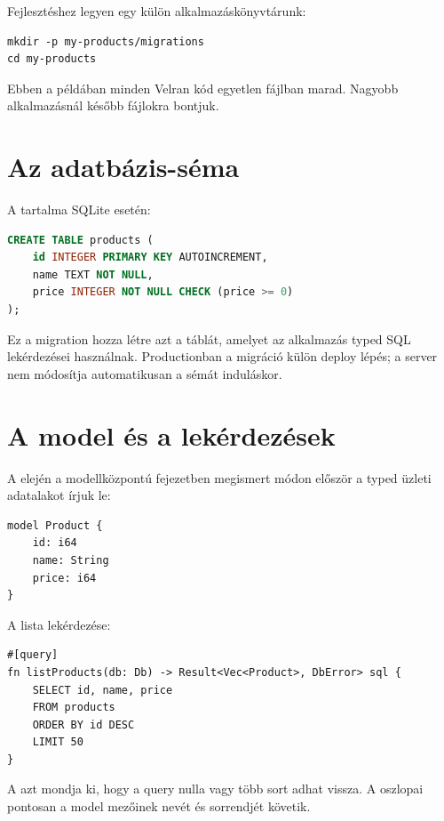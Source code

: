 Fejlesztéshez legyen egy külön alkalmazáskönyvtárunk:

\begin{lstlisting}
mkdir -p my-products/migrations
cd my-products
\end{lstlisting}

Ebben a példában minden Velran kód egyetlen  fájlban marad. Nagyobb alkalmazásnál később  fájlokra bontjuk.

\section{Az adatbázis-séma}

A  tartalma SQLite esetén:

\begin{lstlisting}[language=SQL]
CREATE TABLE products (
    id INTEGER PRIMARY KEY AUTOINCREMENT,
    name TEXT NOT NULL,
    price INTEGER NOT NULL CHECK (price >= 0)
);
\end{lstlisting}

Ez a migration hozza létre azt a táblát, amelyet az alkalmazás typed SQL lekérdezései használnak. Productionban a migráció külön deploy lépés; a server nem módosítja automatikusan a sémát induláskor.

\section{A model és a lekérdezések}

A  elején a modellközpontú fejezetben megismert módon először a typed üzleti adatalakot írjuk le:

\begin{lstlisting}[language=Velran]
model Product {
    id: i64
    name: String
    price: i64
}
\end{lstlisting}

A lista lekérdezése:

\begin{lstlisting}[language=Velran]
#[query]
fn listProducts(db: Db) -> Result<Vec<Product>, DbError> sql {
    SELECT id, name, price
    FROM products
    ORDER BY id DESC
    LIMIT 50
}
\end{lstlisting}

A  azt mondja ki, hogy a query nulla vagy több  sort adhat vissza. A  oszlopai pontosan a model mezőinek nevét és sorrendjét követik.

